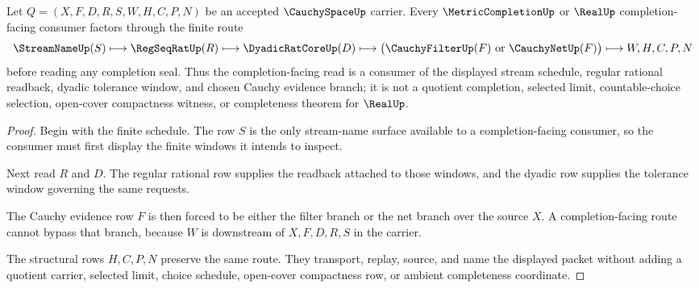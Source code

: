 \begin{theorem}
\label{thm:cauchy-space-regseqrat-metriccompletion-handoff}
Let $Q=(X,F,D,R,S,W,H,C,P,N)$ be an accepted $\CauchySpaceUp$ carrier. Every $\MetricCompletionUp$ or $\RealUp$ completion-facing consumer factors through the finite route
$$
\StreamNameUp(S)\longmapsto\RegSeqRatUp(R)\longmapsto\DyadicRatCoreUp(D)\longmapsto
\bigl(\CauchyFilterUp(F)\ \mathrm{or}\ \CauchyNetUp(F)\bigr)
\longmapsto W,H,C,P,N
$$
before reading any completion seal. Thus the completion-facing read is a consumer of the displayed stream schedule, regular rational readback, dyadic tolerance window, and chosen Cauchy evidence branch; it is not a quotient completion, selected limit, countable-choice selection, open-cover compactness witness, or completeness theorem for $\RealUp$.
\end{theorem}
\begin{proof}
Begin with the finite schedule. The row $S$ is the only stream-name surface available to a completion-facing consumer, so the consumer must first display the finite windows it intends to inspect.

Next read $R$ and $D$. The regular rational row supplies the readback attached to those windows, and the dyadic row supplies the tolerance window governing the same requests.

The Cauchy evidence row $F$ is then forced to be either the filter branch or the net branch over the source $X$. A completion-facing route cannot bypass that branch, because $W$ is downstream of $X,F,D,R,S$ in the carrier.

The structural rows $H,C,P,N$ preserve the same route. They transport, replay, source, and name the displayed packet without adding a quotient carrier, selected limit, choice schedule, open-cover compactness row, or ambient completeness coordinate.
\end{proof}

\begin{closurestatus}{\CauchySpaceUp}
  \theoryclosure{\seedClosure}
  \formalstatus{\unformalizedV}
\end{closurestatus}
